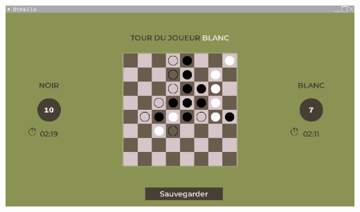 \documentclass[12pt, a4paper, oneside]{article}
\begin{document}
\begin{center}
            \includegraphics[scale=0.7]{partie.png}
        \end{center}
\end{document}
